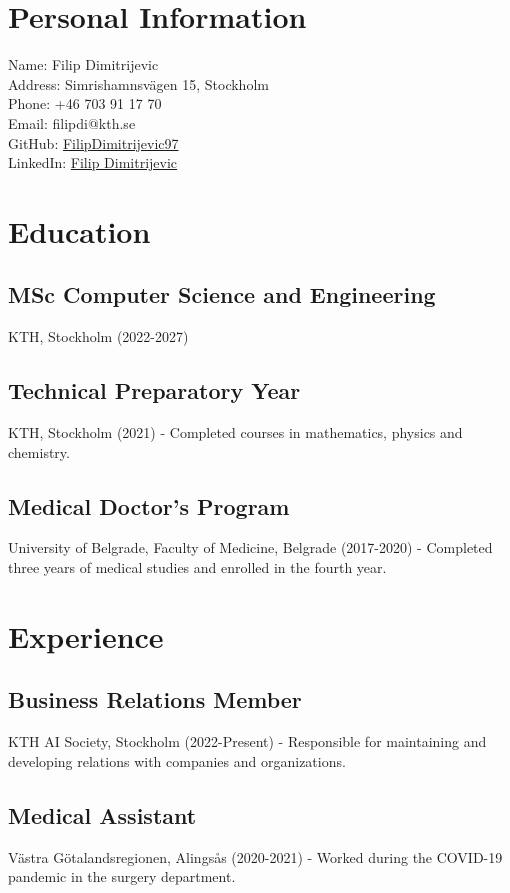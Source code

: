 \documentclass{article}
\begin{document}
\section*{Personal Information}
Name: Filip Dimitrijevic \\
Address: Simrishamnsvägen 15, Stockholm \\
Phone: +46 703 91 17 70 \\
Email: filipdi@kth.se \\
GitHub: \href{https://github.com/FilipDimitrijevic97}{FilipDimitrijevic97} \\
LinkedIn: \href{https://www.linkedin.com/in/filip-dimitrijevic-6b0543215/}{Filip Dimitrijevic}

\section*{Education}
\subsection*{MSc Computer Science and Engineering}
KTH, Stockholm (2022-2027)

\subsection*{Technical Preparatory Year}
KTH, Stockholm (2021)
- Completed courses in mathematics, physics and chemistry.

\subsection*{Medical Doctor's Program}
University of Belgrade, Faculty of Medicine, Belgrade (2017-2020)
- Completed three years of medical studies and enrolled in the fourth year.

\section*{Experience}
\subsection*{Business Relations Member}
KTH AI Society, Stockholm (2022-Present)
- Responsible for maintaining and developing relations with companies and organizations.

\subsection*{Medical Assistant}
Västra Götalandsregionen, Alingsås (2020-2021)
- Worked during the COVID-19 pandemic in the surgery department.
\end{document}

